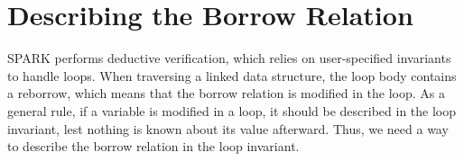 \documentclass[runningheads]{llncs}
\begin{document}
\section{Describing the Borrow Relation}

% 
SPARK performs deductive verification, which relies on user-specified invariants to handle loops. When traversing a linked data structure, the loop body contains a reborrow, which means that the borrow relation is modified in the loop. As a general rule, if a variable is modified in a loop, it should be described in the loop invariant, lest nothing is known about its value afterward. Thus, we need a way to describe the borrow relation in the loop invariant.
\end{document}
